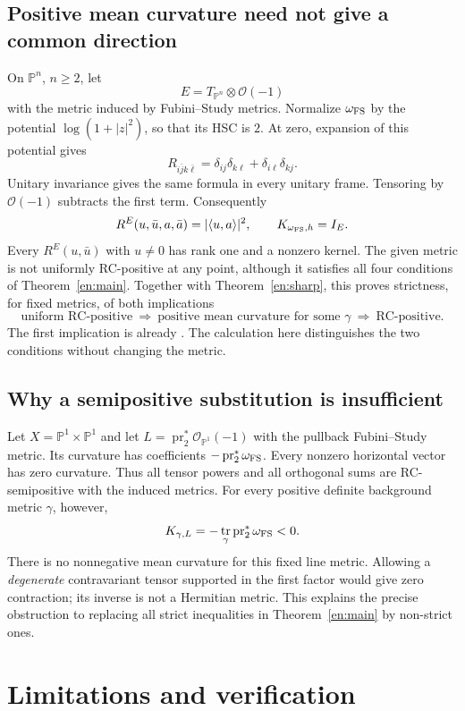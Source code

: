 \documentclass[12pt]{amsart}
\theoremstyle{definition}
\theoremstyle{remark}
\numberwithin{equation}{section}
\DeclareMathOperator{\tr}{tr}
\theoremstyle{definition}
\begin{document}
\subsection{Positive mean curvature need not give a common direction}
On $\mathbb P^n$, $n\geq2$, let
\[
 E=T_{\mathbb P^n}\otimes\mathcal O(-1)
\]
with the metric induced by Fubini--Study metrics. Normalize
$\omega_{\rm FS}$ by the potential $\log(1+|z|^2)$, so that its HSC
is $2$. At zero, expansion of this potential gives
\[
 R_{i\bar j k\bar\ell}
 =\delta_{ij}\delta_{k\ell}+\delta_{i\ell}\delta_{kj}.
\]
Unitary invariance gives the same formula in every unitary frame.
Tensoring by $\mathcal O(-1)$ subtracts the first term. Consequently
\[
 R^E(u,\bar u,a,\bar a)=|\langle u,a\rangle|^2,
 \qquad K_{\omega_{\rm FS},h}=I_E.
\]
Every $R^E(u,\bar u)$ with $u\ne0$ has rank one and a nonzero
kernel. The given metric is not uniformly RC-positive at any point,
although it satisfies all four conditions of Theorem~\ref{en:main}.
Together with Theorem~\ref{en:sharp}, this proves strictness, for fixed
metrics, of both implications
\[
 \text{uniform RC-positive}
 \ \Longrightarrow\ \text{positive mean curvature for some }\gamma
 \ \Longrightarrow\ \text{RC-positive}.
\]
The first implication is already \cite[Proposition 3.6]{en:LZZ}.
The calculation here distinguishes the two conditions without changing
the metric.

\subsection{Why a semipositive substitution is insufficient}
Let $X=\mathbb P^1\times\mathbb P^1$ and let
$L=\operatorname{pr}_2^*\mathcal O_{\mathbb P^1}(-1)$ with the
pullback Fubini--Study metric. Its curvature has coefficients
$-\operatorname{pr}_2^*\omega_{\rm FS}$. Every nonzero horizontal
vector has zero curvature. Thus all tensor powers and all orthogonal
sums are RC-semipositive with the induced metrics. For every positive
definite background metric $\gamma$, however,
\[
 K_{\gamma,L}=-\tr_\gamma\operatorname{pr}_2^*\omega_{\rm FS}<0.
\]
There is no nonnegative mean curvature for this fixed line metric.
Allowing a \emph{degenerate} contravariant tensor supported in the first
factor would give zero contraction; its inverse is not a Hermitian metric.
This explains the precise obstruction to replacing all strict inequalities
in Theorem~\ref{en:main} by non-strict ones.

\section{Limitations and verification}
\label{en:limitations}
\end{document}
